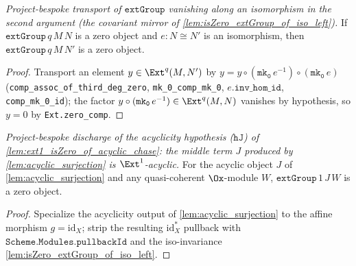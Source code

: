 \begin{lemma}
  \label{lem:isZero_extGroup_of_iso_right}
  \textit{Project-bespoke transport of $\mathtt{extGroup}$ vanishing along an
  isomorphism in the second argument (the covariant mirror of
  \cref{lem:isZero_extGroup_of_iso_left}).}
  If $\mathtt{extGroup}\,q\,M\,N$ is a zero object and $e : N \cong N'$ is an
  isomorphism, then $\mathtt{extGroup}\,q\,M\,N'$ is a zero object.
  \begin{proof}
    Transport an element $y \in \Ext^q(M, N')$ by
    $y = y \circ (\mathtt{mk_0}\,e^{-1}) \circ (\mathtt{mk_0}\,e)$
    (\texttt{comp\_assoc\_of\_third\_deg\_zero}, \texttt{mk\_0\_comp\_mk\_0},
    $e.\mathtt{inv\_hom\_id}$, \texttt{comp\_mk\_0\_id}); the factor
    $y \circ (\mathtt{mk_0}\,e^{-1}) \in \Ext^q(M, N)$ vanishes by hypothesis, so
    $y = 0$ by \texttt{Ext.zero\_comp}.
  \end{proof}
\end{lemma}

\begin{lemma}

  \label{lem:acyclic_ext1_vanishes}
  \textit{Project-bespoke discharge of the acyclicity hypothesis ($\mathtt{hJ}$) of
  \cref{lem:ext1_isZero_of_acyclic_chase}: the middle term $J$ produced by
  \cref{lem:acyclic_surjection} is $\Ext^1$-acyclic.}
  For the acyclic object $J$ of \cref{lem:acyclic_surjection} and any
  quasi-coherent $\Ox$-module $W$, $\mathtt{extGroup}\,1\,J\,W$ is a zero object.
  \begin{proof}
    Specialize the acyclicity output of \cref{lem:acyclic_surjection} to the affine
    morphism $g = \mathrm{id}_X$; strip the resulting $\mathrm{id}_X^*$ pullback with
    $\mathtt{Scheme.Modules.pullbackId}$ and the iso-invariance
    \cref{lem:isZero_extGroup_of_iso_left}.
  \end{proof}
\end{lemma}


